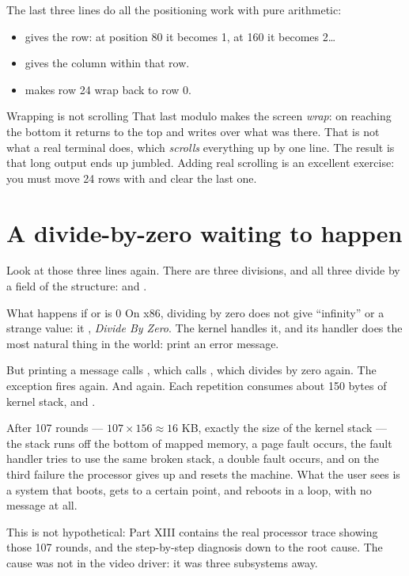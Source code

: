 The last three lines do all the positioning work with pure arithmetic:

\begin{itemize}
  \item {} gives the row: at position 80 it becomes 1, at 160 it becomes 2\ldots
  \item {} gives the column within that row.
  \item {} makes row 24 wrap back to row 0.
\end{itemize}

\begin{warn}{Wrapping is not scrolling}
That last modulo makes the screen \emph{wrap}: on reaching the bottom it returns to the top and
writes over what was there. That is not what a real terminal does, which \emph{scrolls} everything
up by one line. The result is that long output ends up jumbled. Adding real scrolling is an
excellent exercise: you must move 24 rows with  and clear the last one.
\end{warn}

\section{A divide-by-zero waiting to happen}

Look at those three lines again. There are three divisions, and all three divide by a field of the
structure:  and .

\begin{danger}{What happens if  or  is 0}
On x86, dividing by zero does not give ``infinity'' or a strange value: it , \emph{Divide By Zero}. The kernel handles it, and its handler does the most natural
thing in the world: print an error message.

But printing a message calls , which calls , which
divides by zero again. The exception fires again. And again. Each repetition consumes about 150
bytes of kernel stack, and .

After 107 rounds --- $107 \times 156 \approx 16$ KB, exactly the size of the kernel stack ---
the stack runs off the bottom of mapped memory, a page fault occurs, the
fault handler tries to use the same broken stack, a double fault occurs, and on the third failure
the processor gives up and resets the machine. What the user sees is a system that boots, gets to a
certain point, and reboots in a loop, with no message at all.

This is not hypothetical: Part XIII contains the real processor trace showing those 107 rounds, and
the step-by-step diagnosis down to the root cause. The cause was not in the video driver: it was
three subsystems away.
\end{danger}

